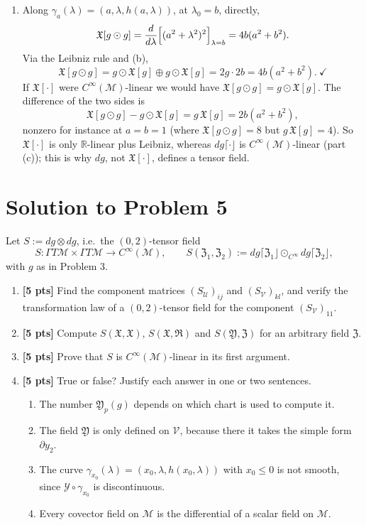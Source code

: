 \documentclass[11pt]{article}
\newcommand{\Cinf}{C^\infty(\mathcal M)}
\newcommand{\probFive}{%
Let $S:=dg\otimes dg$, i.e.\ the $(0,2)$-tensor field
\[
S:\Gamma T\mathcal M\times\Gamma T\mathcal M\to\Cinf,\qquad S(\mathfrak Z_1,\mathfrak Z_2):=dg\lceil\mathfrak Z_1\rfloor\odot_{C^\infty}dg\lceil\mathfrak Z_2\rfloor,
\]
with $g$ as in Problem 3.
\begin{enumerate}[label=(\alph*)]
\item \textbf{[5 pts]} Find the component matrices $(S_{\mathcal U})_{ij}$ and $(S_{\mathcal V})_{kl}$, and verify the transformation law of
a $(0,2)$-tensor field for the component $(S_{\mathcal V})_{11}$.
\item \textbf{[5 pts]} Compute $S(\mathfrak X,\mathfrak X)$, $S(\mathfrak X,\mathfrak R)$ and $S(\mathfrak Y,\mathfrak Z)$ for an arbitrary field $\mathfrak Z$.
\item \textbf{[5 pts]} Prove that $S$ is $C^\infty(\mathcal M)$-linear in its first argument.
\item \textbf{[5 pts]} True or false? Justify each answer in one or two sentences.
\begin{enumerate}[label=(\roman*)]
\item The number $\mathfrak Y_p(g)$ depends on which chart is used to compute it.
\item The field $\mathfrak Y$ is only defined on $\mathcal V$, because there it takes the simple form $\partial y_2$.
\item The curve $\gamma_{x_0}(\lambda)=(x_0,\lambda,h(x_0,\lambda))$ with $x_0\le 0$ is not smooth, since $\mathcal Y\circ\gamma_{x_0}$ is discontinuous.
\item Every covector field on $\mathcal M$ is the differential of a scalar field on $\mathcal M$.
\end{enumerate}
\end{enumerate}}
\begin{document}
\begin{enumerate}[label=(\alph*)]
At the lift of the origin both $\mathfrak R$ and $\mathfrak Y$ vanish, so they span nothing in the $2$-dimensional space $T_p\mathcal M$; moreover $c^1,c^2$ blow up there and are not
elements of $C^\infty(\mathcal M)$. The coefficients are non-constant functions: linear combinations in $\Gamma T\mathcal M$ have scalars in $C^\infty(\mathcal M)$, not in $\mathbb R$, which is the
module structure at work; and a frame that exists over an open subset need not extend to all of $\mathcal M$.
\item Along $\gamma_a(\lambda)=(a,\lambda,h(a,\lambda))$, at $\lambda_0=b$, directly,
\[
\mathfrak X[g\odot g]=\frac{d}{d\lambda}\Bigl[(a^2+\lambda^2)^2\Bigr]_{\lambda=b}=4b(a^2+b^2).
\]
Via the Leibniz rule and (b),
\[
\mathfrak X[g\odot g]=g\odot\mathfrak X[g]\oplus g\odot\mathfrak X[g]=2g\cdot2b=4b(a^2+b^2).\ \checkmark
\]
If $\mathfrak X[\cdot]$ were $C^\infty(\mathcal M)$-linear we would have $\mathfrak X[g\odot g]=g\odot\mathfrak X[g]$. The difference of the two sides is
\[
\mathfrak X[g\odot g]-g\odot\mathfrak X[g]=g\,\mathfrak X[g]=2b(a^2+b^2),
\]
nonzero for instance at $a=b=1$ (where $\mathfrak X[g\odot g]=8$ but $g\,\mathfrak X[g]=4$). So $\mathfrak X[\cdot]$ is only $\mathbb R$-linear plus Leibniz, whereas $dg\lceil\cdot\rfloor$ is $C^\infty(\mathcal M)$-linear
(part (c)); this is why $dg$, not $\mathfrak X[\cdot]$, defines a tensor field.
\end{enumerate}

\section*{Solution to Problem 5}
\probFive
\end{document}
